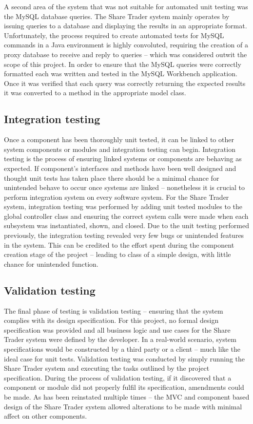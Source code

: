 \documentclass[12pt, a4paper,titlepage]{article}
\begin{document}
A second area of the system that was not suitable for automated unit testing
was the MySQL database queries. The Share Trader system mainly operates by
issuing queries to a database and displaying the results in an appropriate
format. Unfortunately, the process required to create automated tests for
MySQL commands in a Java environment is highly convoluted, requiring the
creation of a proxy database to receive and reply to queries – which was
considered outwit the scope of this project. In order to ensure that the MySQL
queries were correctly formatted each was written and tested in the MySQL
Workbench application. Once it was verified that each query was correctly
returning the expected results it was converted to a method in the appropriate
model class.

\subsection{Integration testing}
Once a component has been thoroughly unit tested, it can be linked to other
system components or modules and integration testing can begin. Integration
testing is the process of ensuring linked systems or components are behaving
as expected. If component's interfaces and methods have been well designed and
thought unit tests has taken place there should be a minimal chance for
unintended behave to occur once systems are linked – nonetheless it is crucial
to perform integration system on every software system.  For the Share Trader
system, integration testing was performed by adding unit tested modules to the
global controller class and ensuring the correct system calls were made when
each subsystem was instantiated, shown, and closed.
Due to the unit testing performed previously, the integration testing revealed
very few bugs or unintended features in the system. This can be credited to
the effort spent during the component creation stage of the project – leading
to class of a simple design, with little chance for unintended function.

\subsection{Validation testing}
The final phase of testing is validation testing – ensuring that the system
complies with its design specification.  For this project, no formal design
specification was provided and all business
logic and use cases for the Share Trader system were defined by the developer.
In a real-world scenario, system specifications would be constructed by a
third party or a client – much like the ideal case for unit tests.  Validation
testing was conducted by simply running the Share Trader system and executing
the tasks outlined by the project specification.
During the process of validation testing, if it discovered that a component or
module did not properly fulfil its specification, amendments could be made.
As has been reinstated multiple times – the MVC and component based design of
the Share Trader system allowed alterations to be made with minimal affect on
other components.
\end{document}

